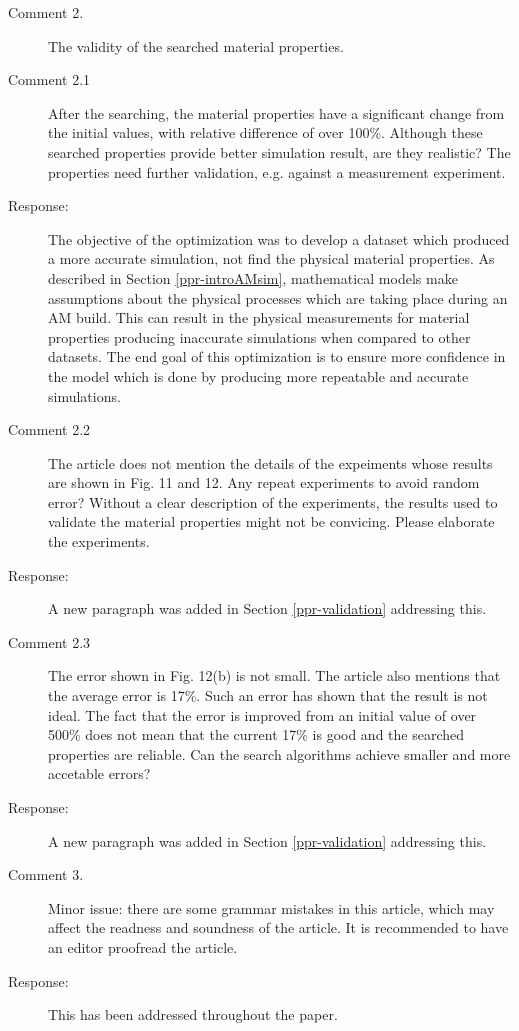 \documentclass{article}
\begin{document}
\begin{description}
	\item[Comment 2.]The validity of the searched material properties. 
	\item[Comment 2.1] After the searching, the material properties have a significant change from the initial values, with relative difference of over 100\%. Although these searched properties provide better simulation result, are they realistic? The properties need further validation, e.g. against a measurement experiment. 
 	\item[Response:] The objective of the optimization was to develop a dataset which produced a more accurate simulation, not find the physical material properties.  As described in Section \ref{ppr-introAMsim}, mathematical models make assumptions about the physical processes which are taking place during an \ac{AM} build.  This can result in the physical measurements for material properties producing inaccurate simulations when compared to other datasets.  The end goal of this optimization is to ensure more confidence in the model which is done by producing more repeatable and accurate simulations. 
	\item[Comment 2.2]The article does not mention the details of the expeiments whose results are shown in Fig. 11 and 12. Any repeat experiments to avoid random error? Without a clear description of the experiments, the results used to validate the material properties might not be convicing. Please elaborate the experiments. 
 	\item[Response:] A new paragraph was added in Section \ref{ppr-validation} addressing this.
	\item[Comment 2.3] The error shown in Fig. 12(b) is not small. The article also mentions that the average error is 17\%. Such an error has shown that the result is not ideal. The fact that the error is improved from an initial value of over 500\% does not mean that the current 17\% is good and the searched properties are reliable. Can the search algorithms achieve smaller and more accetable errors? 
 	\item[Response:] A new paragraph was added in Section \ref{ppr-validation} addressing this.
	\item[Comment 3.] Minor issue: there are some grammar mistakes in this article, which may affect the readness and soundness of the article. It is recommended to have an editor proofread the article.
 	\item[Response:] This has been addressed throughout the paper.
\end{description}
\end{document}
